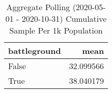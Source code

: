 \begin{table}
\centering
\caption{Aggregate Polling (2020-05-01 - 2020-10-31) Cumulative Sample Per 1k Population}
\label{table:aggregate\_polling\_2020-05-01\_-\_2020-10-31\_cumulative\_sample\_per\_1k\_population}
\begin{tabular}{lr}
\toprule
 battleground &       mean \\
\midrule
        False &  32.099566 \\
         True &  38.040179 \\
\bottomrule
\end{tabular}
\end{table}
